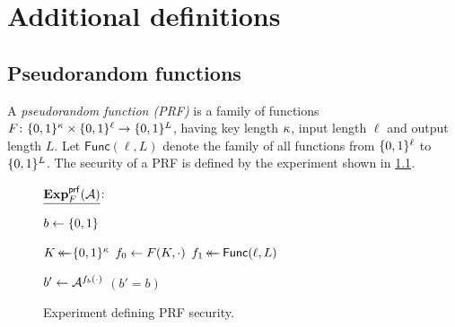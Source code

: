 \chapter{Additional definitions}\label{sec:other_definitions}


\begingroup
\hypersetup{linkcolor=black}
\minitoc
\endgroup


\section{Pseudorandom functions}\label{sec:other_definitions:PRF}





A \emph{pseudorandom function (PRF)} is a family of functions $F \colon \lbrace 0, 1 \rbrace^\kappa \times \lbrace 0, 1 \rbrace^\ell \to \lbrace 0, 1 \rbrace^L$,
having key length $\kappa$,
input length $\ell$ and output length $L$.
Let $\mathsf{Func}(\ell, L)$ denote the family of all functions from $\lbrace 0, 1 \rbrace^\ell$ to $\lbrace 0, 1 \rbrace^L$.
The security of a PRF is defined by the experiment shown in \cref{fig:PRF_security_experiment}.

\begin{figure}



\begin{adjustbox}{margin*=2ex,frame,center}
	\begin{minipage}[t]{0.5\textwidth}
			$\underline{\mathbf{Exp}_{F}^{\mathsf{prf}}(\mathcal{A})}$: 
			\begin{algorithmic}[1]
			
				\State $b \gets \lbrace 0, 1 \rbrace$

				\State $K \operatorname{\leftarrow\mathrel{\mkern-14mu}\leftarrow} \lbrace 0, 1 \rbrace^\kappa$				
				\State $f_0 \gets F(K, \cdot)$
				\State $f_1 \operatorname{\leftarrow\mathrel{\mkern-14mu}\leftarrow} \mathsf{Func}(\ell, L)$

				\State
				\State $b' \gets \mathcal{A}^{f_b(\cdot)}$ 
				\State \Return $(b' = b)$
		
	
			\end{algorithmic}
	\end{minipage}
%		
%	
	

\end{adjustbox}

\caption{Experiment defining PRF security.}
\label{fig:PRF_security_experiment}

\end{figure}

